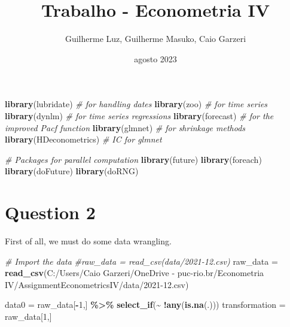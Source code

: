 \documentclass[
]{article}
\title{Trabalho - Econometria IV}
\author{Guilherme Luz, Guilherme Masuko, Caio Garzeri}
\date{agosto 2023}
\newenvironment{Shaded}{\begin{snugshade}}{\end{snugshade}}
\newcommand{\CommentTok}[1]{\textcolor[rgb]{0.56,0.35,0.01}{\textit{#1}}}
\newcommand{\DecValTok}[1]{\textcolor[rgb]{0.00,0.00,0.81}{#1}}
\newcommand{\FunctionTok}[1]{\textcolor[rgb]{0.13,0.29,0.53}{\textbf{#1}}}
\newcommand{\NormalTok}[1]{#1}
\newcommand{\OtherTok}[1]{\textcolor[rgb]{0.56,0.35,0.01}{#1}}
\newcommand{\SpecialCharTok}[1]{\textcolor[rgb]{0.81,0.36,0.00}{\textbf{#1}}}
\newcommand{\StringTok}[1]{\textcolor[rgb]{0.31,0.60,0.02}{#1}}
\begin{document}
\maketitle

\begin{Shaded}
\begin{Highlighting}[]
\FunctionTok{library}\NormalTok{(lubridate) }\CommentTok{\# for handling dates}
\FunctionTok{library}\NormalTok{(zoo) }\CommentTok{\# for time series}
\FunctionTok{library}\NormalTok{(dynlm) }\CommentTok{\# for time series regressions}
\FunctionTok{library}\NormalTok{(forecast) }\CommentTok{\# for the improved Pacf function}
\FunctionTok{library}\NormalTok{(glmnet) }\CommentTok{\# for shrinkage methods}
\FunctionTok{library}\NormalTok{(HDeconometrics) }\CommentTok{\# IC for glmnet}

\CommentTok{\# Packages for parallel computation}
\FunctionTok{library}\NormalTok{(future)}
\FunctionTok{library}\NormalTok{(foreach)}
\FunctionTok{library}\NormalTok{(doFuture)}
\FunctionTok{library}\NormalTok{(doRNG)}
\end{Highlighting}
\end{Shaded}

\hypertarget{question-2}{%
\section{Question 2}\label{question-2}}

First of all, we must do some data wrangling.

\begin{Shaded}
\begin{Highlighting}[]
\CommentTok{\# Import the data}
\CommentTok{\#raw\_data = read\_csv(\textquotesingle{}data/2021{-}12.csv\textquotesingle{})}
\NormalTok{raw\_data }\OtherTok{=} \FunctionTok{read\_csv}\NormalTok{(}\StringTok{\textquotesingle{}C:/Users/Caio Garzeri/OneDrive {-} puc{-}rio.br/Econometria IV/AssignmentEconometricsIV/data/2021{-}12.csv\textquotesingle{}}\NormalTok{)}

\NormalTok{data0 }\OtherTok{=}\NormalTok{ raw\_data[}\SpecialCharTok{{-}}\DecValTok{1}\NormalTok{,] }\SpecialCharTok{\%\textgreater{}\%} \FunctionTok{select\_if}\NormalTok{(}\SpecialCharTok{\textasciitilde{}} \SpecialCharTok{!}\FunctionTok{any}\NormalTok{(}\FunctionTok{is.na}\NormalTok{(.)))}
\NormalTok{transformation }\OtherTok{=}\NormalTok{ raw\_data[}\DecValTok{1}\NormalTok{,]}
\end{Highlighting}
\end{Shaded}
\end{document}
